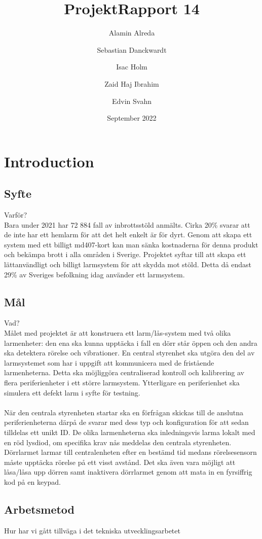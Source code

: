 \documentclass{article}
\title{ProjektRapport 14}
\author{Alamin Alreda \and Sebastian Danckwardt \and Isac Holm \and Zaid Haj Ibrahim   \and Edvin Svahn}
\date{September 2022}
\begin{document}
\maketitle
 
\section{Introduction}
\subsection{Syfte}
Varför?
\\
Bara under 2021 har 72 884 fall av inbrottsstöld anmälts\cite{BRa}. 
Cirka 20\% svarar att de inte har ett hemlarm för att det helt enkelt är för dyrt\cite{MoFor}.
Genom att skapa ett system med ett billigt md407-kort kan man sänka kostnaderna för denna produkt och bekämpa brott i alla områden i Sverige. 
Projektet syftar till att skapa ett lättanvändligt och billigt larmsystem för att skydda mot stöld. 
Detta då endast 29\% av Sveriges befolkning idag använder ett larmsystem\cite{SSF}.
\subsection{Mål}
Vad?
\\
Målet med projektet är att konstruera ett larm/lås-system med två olika larmenheter: 
den ena ska kunna upptäcka i fall en dörr står öppen och den andra ska detektera rörelse och vibrationer. 
En central styrenhet ska utgöra den del av larmsystemet som har i uppgift att kommunicera med de fristående larmenheterna. 
Detta ska möjliggöra centraliserad kontroll och kalibrering av flera periferienheter i ett större larmsystem. 
Ytterligare en periferienhet ska simulera ett defekt larm i syfte för testning.
\\\\
När den centrala styrenheten startar ska en förfrågan skickas till de anslutna periferienheterna därpå de svarar med dess typ och konfiguration för att sedan tilldelas ett unikt ID. De olika larmenheterna ska inledningsvis larma lokalt med en röd lysdiod, om specifika krav nås meddelas den centrala styrenheten. Dörrlarmet larmar till centralenheten efter en bestämd tid medans rörelsesensorn måste upptäcka rörelse på ett visst avstånd. Det ska även vara möjligt att låsa/låsa upp dörren samt inaktivera dörrlarmet genom att mata in en fyrsiffrig kod på en keypad.


\subsection{Arbetsmetod}
Hur har vi gått tillväga i det tekniska utvecklingsarbetet
\end{document}

